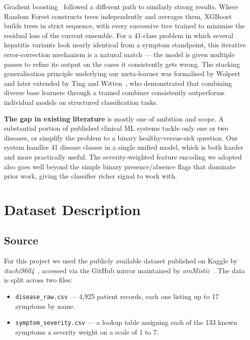 \documentclass[12pt,a4paper]{article}
\begin{document}
Gradient boosting~\cite{friedman2001} followed a different path to similarly strong results. Where Random Forest constructs trees independently and averages them, XGBoost~\cite{chen2016xgboost} builds trees in strict sequence, with every successive tree trained to minimise the residual loss of the current ensemble. For a 41-class problem in which several hepatitis variants look nearly identical from a symptom standpoint, this iterative error-correction mechanism is a natural match --- the model is given multiple passes to refine its output on the cases it consistently gets wrong. The stacking generalisation principle underlying our meta-learner was formalised by Wolpert~\cite{wolpert1992} and later extended by Ting and Witten~\cite{ting1999stacking}, who demonstrated that combining diverse base learners through a trained combiner consistently outperforms individual models on structured classification tasks.

\textbf{The gap in existing literature} is mostly one of ambition and scope. A substantial portion of published clinical ML systems tackle only one or two diseases, or simplify the problem to a binary healthy-versus-sick question. Our system handles 41 disease classes in a single unified model, which is both harder and more practically useful. The severity-weighted feature encoding we adopted also goes well beyond the simple binary presence/absence flags that dominate prior work, giving the classifier richer signal to work with.

\section{Dataset Description}

\subsection{Source}
For this project we used the publicly available dataset published on Kaggle by \textit{itachi9604}~\cite{itachi2020}, accessed via the GitHub mirror maintained by \textit{amMistic}~\cite{ammistic2023}. The data is split across two files:

\begin{itemize}
    \item \texttt{disease\_raw.csv} --- 4,925 patient records, each one listing up to 17 symptoms by name.
    \item \texttt{symptom\_severity.csv} --- a lookup table assigning each of the 133 known symptoms a severity weight on a scale of 1 to 7.
\end{itemize}
\end{document}
